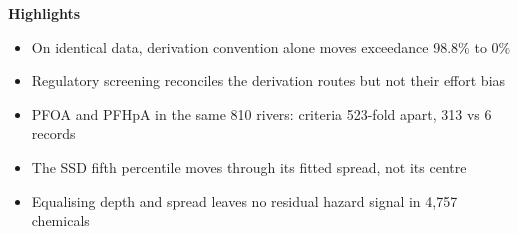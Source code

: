 \documentclass[11pt]{article}
\begin{document}
\noindent\textbf{Highlights}\\[2mm]
\begin{itemize}[leftmargin=5mm,itemsep=2mm]
\item On identical data, derivation convention alone moves exceedance 98.8\% to 0\%
\item Regulatory screening reconciles the derivation routes but not their effort bias
\item PFOA and PFHpA in the same 810 rivers: criteria 523-fold apart, 313 vs 6 records
\item The SSD fifth percentile moves through its fitted spread, not its centre
\item Equalising depth and spread leaves no residual hazard signal in 4,757 chemicals
\end{itemize}
\end{document}
